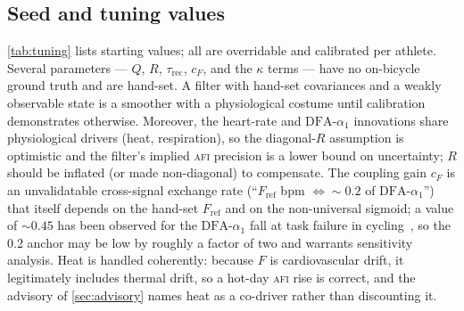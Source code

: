 \documentclass[11pt]{article}
\newcommand{\afi}{\textup{\textsc{afi}}}
\newcommand{\aone}{\ensuremath{\text{DFA-}\alpha_1}}
\newcommand{\Fstate}{\ensuremath{F}}
\begin{document}
\subsection{Seed and tuning values}\label{sec:tuning}
\autoref{tab:tuning} lists starting values; all are overridable and calibrated per athlete. Several parameters --- $Q$, $R$, $\tau_{\text{rec}}$, $c_F$, and the $\kappa$ terms --- have no on-bicycle ground truth and are hand-set. A filter with hand-set covariances and a weakly observable state is a smoother with a physiological costume until calibration demonstrates otherwise. Moreover, the heart-rate and $\aone$ innovations share physiological drivers (heat, respiration), so the diagonal-$R$ assumption is optimistic and the filter's implied \afi{} precision is a lower bound on uncertainty; $R$ should be inflated (or made non-diagonal) to compensate. The coupling gain $c_F$ is an unvalidatable cross-signal exchange rate (``$F_{\text{ref}}$ bpm $\Leftrightarrow \sim0.2$ of $\aone$'') that itself depends on the hand-set $F_{\text{ref}}$ and on the non-universal sigmoid; a value of $\sim0.45$ has been observed for the $\aone$ fall at task failure in cycling~\cite{rogers2025}, so the 0.2 anchor may be low by roughly a factor of two and warrants sensitivity analysis. Heat is handled coherently: because $\Fstate$ is cardiovascular drift, it legitimately includes thermal drift, so a hot-day \afi{} rise is correct, and the advisory of \autoref{sec:advisory} names heat as a co-driver rather than discounting it.
\end{document}
